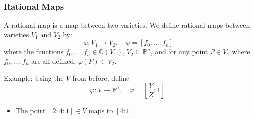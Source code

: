 \documentclass{beamer}
\theoremstyle{definition}
\begin{document}
\begin{frame}
    \frametitle{Rational Maps}
    A rational map is a map between two varieties. We define rational maps between varieties \(V_1\) and \(V_2\) by:
    \[\varphi : V_1 \to V_2, \quad \varphi = [f_0: \ldots: f_n]\] where the functions \(f_0, \ldots, f_n \in \mathbb{C}(V_1)\), \(V_2\subseteq\mathbb{P}^n\), and for any point \(P\in V_1\) where \(f_0, \ldots, f_n\) are all defined, \(\varphi(P)\in V_2\).

    Example: Using the \(V\) from before, define \[\varphi: V \to \mathbb{P}^1, \quad \varphi = \left[ \frac{Y}{Z} : 1\right].\]
    \begin{itemize}
        \item[\textrightarrow] The point \([2 : 4 : 1]\in V\) maps to \(\left[4 : 1\right]\)
        
    \end{itemize}
   
\end{frame}
\end{document}
